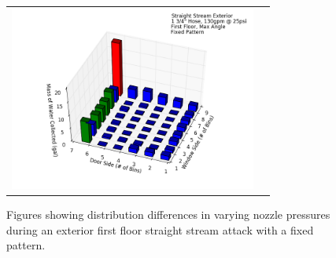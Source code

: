 \documentclass{article}
\begin{document}
\begin{figure}[ht]
\begin{tabular*}{\textwidth}{lr}
\includegraphics[width=3.2in]{../ADD_Analysis/Figures/15-12-08_162547_Datafile_Straight_Stream_Exterior.png} \\
\end{tabular*}
\caption{Figures showing distribution differences in varying nozzle pressures during an exterior first floor straight stream attack with a fixed pattern.}
\label{fig:Exterior_First_Floor_Varying_Nozzle_Pressure_SS_Fixed_Pattern}
\end{figure}

\clearpage
\end{document}
